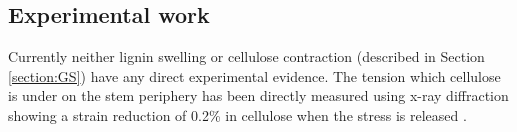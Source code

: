 \subsection{Experimental work}
\label{subsection:Experimental work}
Currently neither lignin swelling or cellulose contraction (described in Section
\ref{section:GS}) have any direct experimental evidence. The tension which cellulose is under
on the stem periphery has been directly measured using x-ray diffraction showing
a strain reduction of 0.2\% in cellulose when the stress is released \citep{Clair_2006}.
